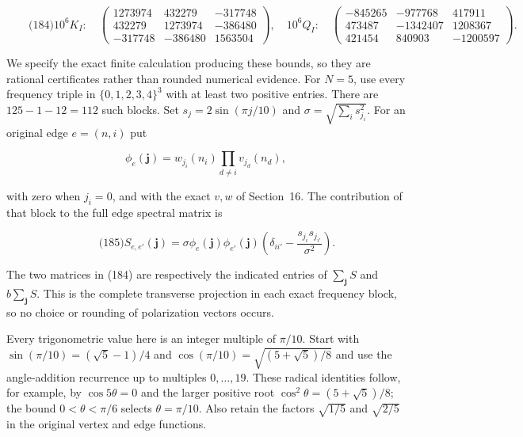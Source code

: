 \[
\qquad\text{(184)}
 10^6K_I:\quad
 \begin{pmatrix}
 1273974&432279&-317748\\
 432279&1273974&-386480\\
 -317748&-386480&1563504
 \end{pmatrix},\quad
 10^6Q_I:\quad
 \begin{pmatrix}
 -845265&-977768&417911\\
 473487&-1342407&1208367\\
 421454&840903&-1200597
 \end{pmatrix}.
\]

We specify the exact finite calculation producing these bounds, so they
are rational certificates rather than rounded numerical evidence. For
\(N=5\), use every frequency triple in \(\{0,1,2,3,4\}^3\) with at least
two positive entries. There are \(125-1-12=112\) such blocks. Set
\(s_j=2\sin(\pi j/10)\) and \(\sigma=\sqrt{\sum_i s_{j_i}^2}\). For an
original edge \(e=(n,i)\) put

\[
\phi_e(\boldsymbol j)=w_{j_i}(n_i)\prod_{d\ne i}v_{j_d}(n_d),
\]

with zero when \(j_i=0\), and with the exact \(v,w\) of Section~16. The
contribution of that block to the full edge spectral matrix is

\[
\qquad\text{(185)}
 S_{e,e'}(\boldsymbol j)=\sigma\phi_e(\boldsymbol j)
 \phi_{e'}(\boldsymbol j)
       \left(\delta_{i i'}-\frac{s_{j_i}s_{j_{i'}}}{\sigma^2}\right).
\]

The two matrices in (184) are respectively the indicated entries of
\(\sum_{\boldsymbol j}S\) and \(b\sum_{\boldsymbol j}S\). This is the
complete transverse projection in each exact frequency block, so no
choice or rounding of polarization vectors occurs.

Every trigonometric value here is an integer multiple of \(\pi/10\).
Start with \(\sin(\pi/10)=(\sqrt5-1)/4\) and
\(\cos(\pi/10)=\sqrt{(5+\sqrt5)/8}\) and use the angle-addition
recurrence up to multiples \(0,\ldots,19\). These radical identities
follow, for example, by \(\cos5\theta=0\) and the larger positive root
\(\cos^2\theta=(5+\sqrt5)/8\); the bound \(0<\theta<\pi/6\) selects
\(\theta=\pi/10\). Also retain the factors \(\sqrt{1/5}\) and
\(\sqrt{2/5}\) in the original vertex and edge functions.

